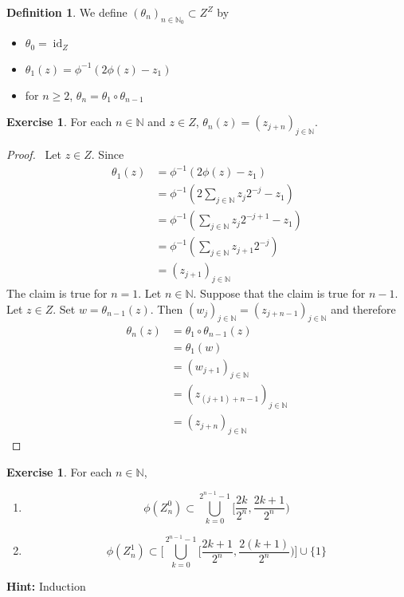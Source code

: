 \documentclass{book}
\theoremstyle{definition}
\newtheorem{defn}[definition]{Definition}
\newtheorem{ex}[definition]{Exercise}
\newcommand{\N}{\mathbb{N}}
\newcommand{\lex}[1]{\label{ex:#1}}
\DeclareMathOperator{\id}{id}
\DeclareMathOperator*{\0}{\mbf{0}}
\DeclareMathOperator*{\1}{\mbf{1}}
\newcommand{\tbf}[1]{\textbf{#1}}
\begin{document}
	\begin{defn} \lex{28004} 
		We define $(\theta_n)_{n \in \N_0} \subset Z^Z$ by
		\begin{itemize}
			\item 	$\theta_0 = \id_Z$
			\item $\theta_1 (z) = \phi^{-1}(2 \phi(z) - z_1)$ 
			\item for $n \geq 2$, $\theta_n = \theta_1 \circ \theta_{n-1}$
		\end{itemize}
	\end{defn}

	\begin{ex} \lex{28005} 
		For each $n \in \N$ and $z \in Z$, $\theta_n(z) = (z_{j+n})_{j \in \N}$.
	\end{ex}

	\begin{proof} \
		Let $z \in Z$. Since  
		\begin{align*}
			\theta_1(z) 
			& = \phi^{-1}(2 \phi(z) - z_1) \\
			& = \phi^{-1}(2 \sum_{j \in \N} z_j2^{-j} - z_1) \\
			& = \phi^{-1}(\sum_{j \in \N} z_j2^{-j+1} - z_1) \\
			& = \phi^{-1}(\sum_{j \in \N} z_{j+1}2^{-j}) \\
			& = (z_{j+1})_{j \in \N}
		\end{align*}
		The claim is true for $n =1$. Let $n \in \N$. Suppose that the claim is true for $n-1$. Let $z \in Z$. Set $w = \theta_{n-1}(z)$. Then $(w_{j})_{j \in \N} = (z_{j+n -1})_{j \in \N}$ and therefore
		\begin{align*}
			\theta_n(z) 
			& = \theta_1 \circ \theta_{n-1} (z) \\
			& = \theta_1 (w) \\
			& = (w_{j + 1})_{j \in \N} \\
			& = (z_{(j+ 1) +  n-1} )_{j \in \N} \\
			& = (z_{j+  n })_{j \in \N}
		\end{align*}
	\end{proof}


	\begin{ex} \lex{28005.1} 
		For each $n \in \N$, 
		\begin{enumerate}
			\item $$\phi(Z_n^0) \subset \bigcup\limits_{k =0}^{2^{n-1} -1} \bigg[ \frac{2k}{2^n}, \frac{2k+1}{2^n} \bigg)$$
			\item $$\phi(Z_n^1) \subset \bigg[ \bigcup\limits_{k =0}^{2^{n-1} -1} \bigg[ \frac{2k + 1}{2^n}, \frac{2(k+1)}{2^n} \bigg) \bigg] \cup \{1\}$$
		\end{enumerate}
		\tbf{Hint:} Induction
	\end{ex}
\end{document}
